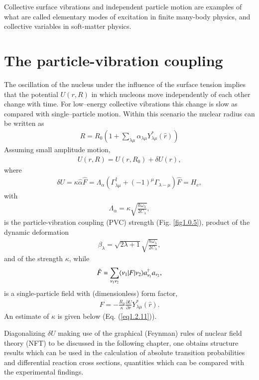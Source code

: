 Collective surface vibrations and independent particle motion are examples of what are called elementary modes of excitation in finite many-body physics, and collective variables in soft-matter physics.

\section{The particle-vibration coupling}\label{Sect1.2}
The oscillation of the nucleus under the influence of the surface tension implies that the potential $U(r,R)$ in which nucleons move independently of each other change with time. For low--energy collective vibrations this change is slow as compared with single--particle motion. Within this scenario the nuclear radius can be written as  
\begin{align}\label{eq1.0.12}
R=R_0\left(1+\sum_{\lambda\mu}\alpha_{\lambda\mu}Y_{\lambda\mu}^*(\hat r)\right)
\end{align}
Assuming small amplitude motion,
\begin{align}\label{eq1.0.13}
U(r,R)=U(r,R_0)+\delta U(r),
\end{align}
where
\begin{align}\label{eq1.0.14}
\delta U=\kappa\hat \alpha \hat F=\Lambda_\alpha\left(\Gamma_{\lambda\mu}^\dagger+(-1)^\mu\Gamma_{\lambda-\mu}\right)\hat F=H_c,
\end{align}
with
\begin{align}\label{eq1.2.4x}
\Lambda_\alpha=\kappa\sqrt{\frac{\hbar\omega_\lambda}{2C_\lambda}},
\end{align}
is the particle-vibration coupling (PVC) strength (Fig. \ref{fig1.0.5}), product of the dynamic deformation
\begin{align}\label{eq1.2.5x}
\beta_\lambda=\sqrt{2\lambda+1}\sqrt{\frac{\hbar\omega_\lambda}{2C_\lambda}},
\end{align}
and of the strength $\kappa$, while 
\begin{align}\label{eq1.0.15}
\hat F=\sum_{\nu_1\nu_2}\langle {\nu_1}|F|{\nu_2} \rangle a_{\nu_1}^\dagger a_{\nu_2},
\end{align}
is a single-particle field with  (dimensionless) form factor,
\begin{align}\label{eq1.0.16}
F=-\frac{R_0}{\kappa}\frac{\partial U}{\partial r}Y^*_{\lambda\mu}(\hat r).
\end{align}
An estimate of $\kappa$ is given below (Eq. (\ref{eq1.2.11})).


 Diagonalizing $\delta U$ making use of the graphical (Feynman) rules of nuclear field theory (NFT) to be discussed in the following chapter, one obtains structure results which can be used in the calculation of absolute transition probabilities and differential reaction cross sections, quantities which can be compared with the experimental findings.

